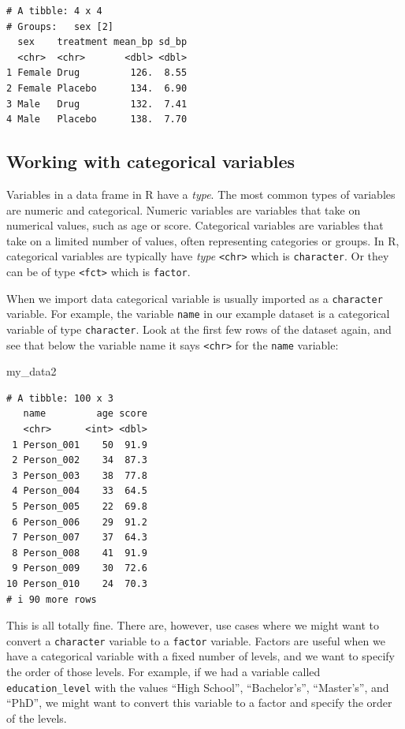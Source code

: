 \documentclass[
  letterpaper,
  8pt,
  a4paper]{book}
\newenvironment{Shaded}{\begin{snugshade}}{\end{snugshade}}
\newcommand{\NormalTok}[1]{\textcolor[rgb]{0.00,0.23,0.31}{#1}}
\begin{document}
\begin{verbatim}
# A tibble: 4 x 4
# Groups:   sex [2]
  sex    treatment mean_bp sd_bp
  <chr>  <chr>       <dbl> <dbl>
1 Female Drug         126.  8.55
2 Female Placebo      134.  6.90
3 Male   Drug         132.  7.41
4 Male   Placebo      138.  7.70
\end{verbatim}

\subsection*{Working with categorical
variables}\label{working-with-categorical-variables}

Variables in a data frame in R have a \emph{type}. The most common types
of variables are numeric and categorical. Numeric variables are
variables that take on numerical values, such as age or score.
Categorical variables are variables that take on a limited number of
values, often representing categories or groups. In R, categorical
variables are typically have \emph{type}
\texttt{\textless{}chr\textgreater{}} which is \texttt{character}. Or
they can be of type \texttt{\textless{}fct\textgreater{}} which is
\texttt{factor}.

When we import data categorical variable is usually imported as a
\texttt{character} variable. For example, the variable \texttt{name} in
our example dataset is a categorical variable of type
\texttt{character}. Look at the first few rows of the dataset again, and
see that below the variable name it says
\texttt{\textless{}chr\textgreater{}} for the \texttt{name} variable:

\begin{Shaded}
\begin{Highlighting}[]
\NormalTok{my\_data2}
\end{Highlighting}
\end{Shaded}

\begin{verbatim}
# A tibble: 100 x 3
   name         age score
   <chr>      <int> <dbl>
 1 Person_001    50  91.9
 2 Person_002    34  87.3
 3 Person_003    38  77.8
 4 Person_004    33  64.5
 5 Person_005    22  69.8
 6 Person_006    29  91.2
 7 Person_007    37  64.3
 8 Person_008    41  91.9
 9 Person_009    30  72.6
10 Person_010    24  70.3
# i 90 more rows
\end{verbatim}

This is all totally fine. There are, however, use cases where we might
want to convert a \texttt{character} variable to a \texttt{factor}
variable. Factors are useful when we have a categorical variable with a
fixed number of levels, and we want to specify the order of those
levels. For example, if we had a variable called
\texttt{education\_level} with the values ``High School'',
``Bachelor's'', ``Master's'', and ``PhD'', we might want to convert this
variable to a factor and specify the order of the levels.
\end{document}
